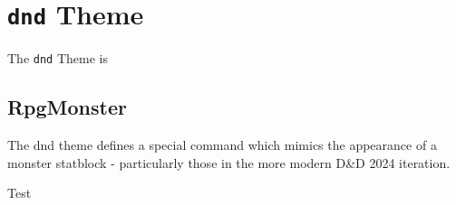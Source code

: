 \chapter{\texttt{dnd} Theme}

	The \texttt{dnd} Theme is 

	\section{RpgMonster}

		The dnd theme defines a special command which mimics the appearance of a monster statblock - particularly those in the more modern D\&D 2024 iteration. 

		\begin{multicols}{2}
		\begin{RpgMonster}{Test}
			
		\end{RpgMonster}
		\clearpage
		\Blindtext
	\end{multicols}

